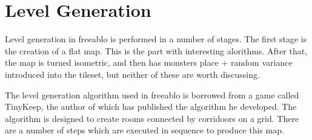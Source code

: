 \newpage
	
\section{Level Generation}
    Level generation in freeablo is performed in a number of stages. The first stage is the creation of a flat map. This is the part with interesting alorithms.
    After that, the map is turned isometric, and then has monsters place + random variance introduced into the tileset, but neither of these are worth discussing.

    \mbox{}

    The level generation algorithm used in freeablo is borrowed from a game called TinyKeep\cite{tinykeep}, the author of which has published the algorithm he developed\cite{tinygen}.
    The algorithm is designed to create rooms connected by corridoors on a grid.
    There are a number of steps which are executed in sequence to produce this map.
